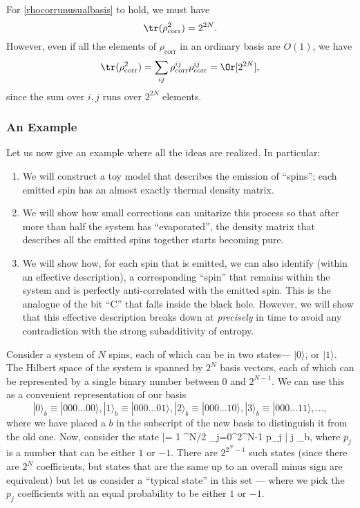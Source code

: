 For \eqref{rhocorrunusualbasis} to hold, we must have
\[
\tr(\rho_{\text{corr}}^2) = 2^{2 N}.
 \]
However, even if all the elements of $\rho_{\text{corr}}$ in an ordinary basis are $O(1)$, we have
\[
\tr(\rho_{\text{corr}}^2)= \sum_{i j} \rho_{\text{corr}}^{i j} \rho_{\text{corr}}^{i j} = \Or[2^{2N}],
 \]
since the sum over $i,j$ runs over $2^{2N}$ elements. 

\subsubsection{An Example \label{sec:toy}}
Let us now give an example where all the ideas are realized. In particular:
\begin{enumerate}
\item
We will construct a toy model that describes the emission of ``spins''; each emitted spin has an almost exactly thermal density matrix. 
\item
We will show how small corrections can unitarize this process so that after more than half the system has ``evaporated'', the density matrix that describes all the emitted spins together starts becoming pure.
\item
We will show how, for each spin that is emitted, we can also identify (within an effective description), a corresponding ``spin'' that remains within the system and is perfectly anti-correlated with the emitted spin. This is the analogue of the bit ``C'' that falls inside the black hole. However, we will show that 
this effective description breaks down at {\em precisely} in time to avoid any contradiction with the strong subadditivity of entropy.
\end{enumerate}

Consider a system of $N$ spins, each of which can be in two states--- $|0\rangle$, or $|1 \rangle$. The Hilbert space of the system is spanned by $2^N$ basis vectors, each of which can be represented by a single binary number between $0$ and $2^{N-1}$. We can use this as a convenient representation of our basis
\[
|0 \rangle_{b} \equiv |000\ldots00 \rangle, |1 \rangle_{b} \equiv |000\ldots01\rangle, |2 \rangle_{b} \equiv |000\ldots10\rangle, |3 \rangle_{b} \equiv |000\ldots11\rangle, \ldots,
 \]
where we have placed a $b$ in the subscript of the new basis to distinguish it from the old one.
Now, consider the state
\be
\label{typicalstate}
|\Psi\rangle = {1 ^{N/2}} \sum_{j=0}^{2^N-1} p_j | j \rangle_b,
\ee
where $p_j$ is a number that can be either $1$ or $-1$. There are $2^{2^N-1}$ such states (since there are $2^N$ coefficients, but states that are the same up to an overall minus sign are equivalent) but let us consider a ``typical state'' in this set --- where we pick the $p_j$ coefficients with an equal probability to be either $1$ or $-1$.

